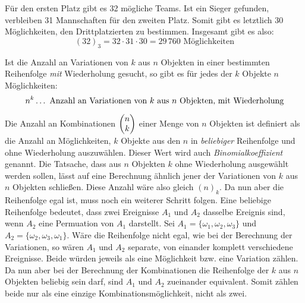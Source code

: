 
F\"{u}r den ersten Platz gibt es 32 m\"{o}gliche Teams. Ist ein Sieger gefunden, verbleiben 31 Mannschaften f\"{u}r den zweiten Platz. Somit gibt es letztlich 30 M\"{o}glichkeiten, den Drittplatzierten zu bestimmen. Insgesamt gibt es also: $$(32)_3 = 32 \cdot 31 \cdot 30 = 29 \, 760 \text{ M\"{o}glichkeiten}$$

Ist die Anzahl an Variationen von $k$ aus $n$ Objekten in einer bestimmten Reihenfolge \emph{mit} Wiederholung gesucht, so gibt es f\"{u}r jedes der $k$ Objekte $n$ M\"{o}glichkeiten: $$n^k \dots \,\, \text{Anzahl an Variationen von $k$ aus $n$ Objekten, mit Wiederholung}$$


Die Anzahl an Kombinationen $\begin{pmatrix}n \\ k\end{pmatrix}$ einer Menge von $n$ Objekten ist definiert als die Anzahl an M\"{o}glichkeiten, $k$ Objekte aus den $n$ in \emph{beliebiger} Reihenfolge und ohne Wiederholung auszuw\"{a}hlen. Dieser Wert wird auch \emph{Binomialkoeffizient} genannt. Die Tatsache, dass aus $n$ Objekten $k$ ohne Wiederholung ausgew\"{a}hlt werden sollen, l\"{a}sst auf eine Berechnung \"{a}hnlich jener der Variationen von $k$ aus $n$ Objekten schlie\ss{}en. Diese Anzahl w\"{a}re also gleich $(n)_k$. Da nun aber die Reihenfolge egal ist, muss noch ein weiterer Schritt folgen. Eine beliebige Reihenfolge bedeutet, dass zwei Ereignisse $A_1$ und $A_2$ dasselbe Ereignis sind, wenn $A_2$ eine Permuation von $A_1$ darstellt. Sei $A_1 = \{\omega_1, \omega_2, \omega_3\}$ und $A_2 = \{ \omega_2, \omega_3, \omega_1\}$. W\"{a}re die Reihenfolge nicht egal, wie bei der Berechnung der Variationen, so w\"{a}ren $A_1$ und $A_2$ separate, von einander komplett verschiedene Ereignisse. Beide w\"{u}rden jeweils als eine M\"{o}glichkeit bzw. eine Variation z\"{a}hlen. Da nun aber bei der Berechnung der Kombinationen die Reihenfolge der $k$ aus $n$ Objekten beliebig sein darf, sind $A_1$ und $A_2$ zueinander equivalent. Somit z\"{a}hlen beide nur als eine einzige Kombinationsm\"{o}glichkeit, nicht als zwei.

